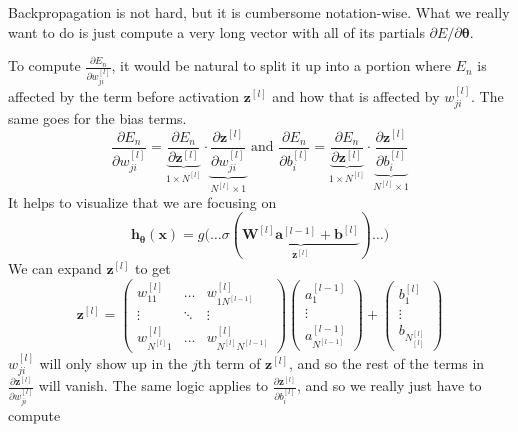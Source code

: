 \documentclass{article}
\begin{document}
  Backpropagation is not hard, but it is cumbersome notation-wise. What we really want to do is just compute a very long vector with all of its partials $\partial E / \partial \boldsymbol{\theta}$. 

  \begin{algo}[Backpropagation]
    To compute $\frac{\partial E_n}{\partial w_{ji}^{[l]}}$, it would be natural to split it up into a portion where $E_n$ is affected by the term before activation $\mathbf{z}^{[l]}$ and how that is affected by $w_{ji}^{[l]}$. The same goes for the bias terms. 
    \begin{equation}
      \frac{\partial E_n}{\partial w_{ji}^{[l]}} = \underbrace{\frac{\partial E_n}{\partial \mathbf{z}^{[l]}}}_{1 \times N^{[l]}} \cdot \underbrace{\frac{\partial \mathbf{z}^{[l]}}{\partial w_{ji}^{[l]}}}_{N^{[l]} \times 1} \text{ and } \frac{\partial E_n}{\partial b_{i}^{[l]}} = \underbrace{\frac{\partial E_n}{\partial \mathbf{z}^{[l]}}}_{1 \times N^{[l]}} \cdot \underbrace{\frac{\partial \mathbf{z}^{[l]}}{\partial b_{i}^{[l]}}}_{N^{[l]} \times 1}
    \end{equation}
    It helps to visualize that we are focusing on 
    \begin{equation}
      \mathbf{h}_{\boldsymbol{\theta}} (\mathbf{x}) = g\big( \ldots \sigma( \underbrace{\mathbf{W}^{[l]} \mathbf{a}^{[l-1]} + \mathbf{b}^{[l]}}_{\mathbf{z}^{[l]}} )  \ldots \big)
    \end{equation}
    We can expand $\mathbf{z}^{[l]}$ to get 
    \begin{equation}
      \mathbf{z}^{[l]} = \begin{pmatrix} w_{11}^{[l]} & \ldots & w_{1 N^{[l-1]}}^{[l]} \\ \vdots & \ddots & \vdots \\ w_{N^{[l]} 1}^{[l]} & \ldots & w_{N^{[l]} N^{[l-1]}}^{[l]} \end{pmatrix} 
      \begin{pmatrix} a^{[l-1]}_1 \\ \vdots \\ a^{[l-1]}_{N^{[l-1]}} \end{pmatrix} + \begin{pmatrix} b_1^{[l]} \\ \vdots \\ b_{N^{[l]}_{[l]}} \end{pmatrix}
    \end{equation}
    $w_{ji}^{[l]}$ will only show up in the $j$th term of $\mathbf{z}^{[l]}$, and so the rest of the terms in $\frac{\partial \mathbf{z}^{[l]}}{\partial w_{ji}^{[l]}}$ will vanish. The same logic applies to $\frac{\partial \mathbf{z}^{[l]}}{\partial b_{i}^{[l]}}$, and so we really just have to compute 

\end{algo}
\end{document}
